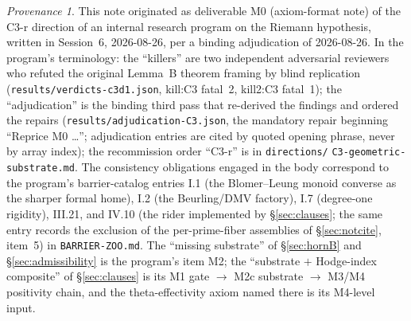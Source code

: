 \documentclass[11pt]{article}
\theoremstyle{plain}
\theoremstyle{definition}
\theoremstyle{remark}
\newtheorem*{provenance}{Provenance}
\begin{document}
\begin{provenance}
\sloppy
This note originated as deliverable M0 (axiom-format note) of the C3-r
direction of an internal research program on the Riemann hypothesis, written in
Session~6, 2026-08-26, per a binding adjudication of 2026-08-26. In the
program's terminology: the ``killers'' are two independent adversarial
reviewers who refuted the original Lemma~B theorem framing by blind
replication (\texttt{results/verdicts-c3d1.json}, kill:C3 fatal~2, kill2:C3
fatal~1); the ``adjudication'' is the binding third pass that re-derived the
findings and ordered the repairs (\texttt{results/adjudication-C3.json}, the
mandatory repair beginning ``Reprice M0 \ldots''; adjudication entries are
cited by quoted opening phrase, never by array index); the recommission order
``C3-r'' is in \texttt{directions/}\allowbreak
\texttt{C3-geometric-substrate.md}. The consistency
obligations engaged in the body correspond to the program's barrier-catalog
entries I.1 (the Blomer--Leung monoid converse as the sharper formal home),
I.2 (the Beurling/DMV factory), I.7 (degree-one rigidity), III.21, and IV.10
(the rider implemented by \S\ref{sec:clauses}; the same entry records the
exclusion of the per-prime-fiber assemblies of \S\ref{sec:notcite},
item~5) in \texttt{BARRIER-ZOO.md}. The ``missing substrate'' of
\S\ref{sec:hornB} and \S\ref{sec:admissibility} is the program's item M2; the
``substrate $+$ Hodge-index composite'' of \S\ref{sec:clauses} is its M1 gate
$\to$ M2c substrate $\to$ M3/M4 positivity chain, and the theta-effectivity
axiom named there is its M4-level input.


\end{provenance}
\end{document}
